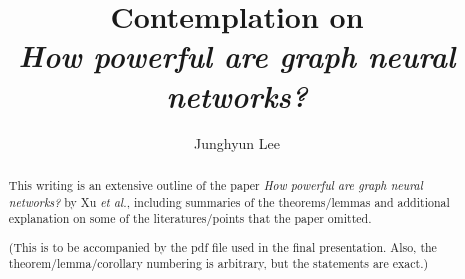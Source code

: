 \documentclass[a4paper, twoside]{report}
\title{Contemplation on \\
{\it How powerful are graph neural networks?}}
\author{Junghyun Lee}
\theoremstyle{break}
\begin{document}


\begin{abstract}
This writing is an extensive outline of the paper {\it How powerful are graph neural networks?} by Xu {\it et al.}, including summaries of the theorems/lemmas and additional explanation on some of the literatures/points that the paper omitted.

(This is to be accompanied by the pdf file used in the final presentation. Also, the theorem/lemma/corollary numbering is arbitrary, but the statements are exact.)
\end{abstract}

\tableofcontents
\listoffigures






%



\printbibliography
%
%
\end{document}
